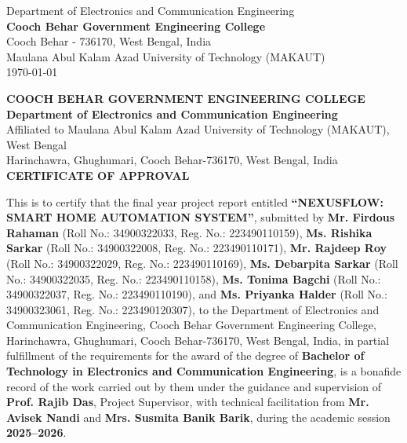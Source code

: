 \documentclass[12pt,a4paper,oneside]{report}
\begin{document}
\begin{titlepage}
\begin{center}
    \vfill
    
    {\fontsize{12}{15}\selectfont Department of Electronics and Communication Engineering} \\
    {\fontsize{14}{18}\selectfont \textbf{Cooch Behar Government Engineering College}} \\
    {\fontsize{11}{14}\selectfont Cooch Behar - 736170, West Bengal, India} \\
    {\fontsize{12}{15}\selectfont Maulana Abul Kalam Azad University of Technology (MAKAUT)} \\[0.4cm]
    {\fontsize{12}{15}\selectfont \today}
\end{center}
\end{titlepage}

\newpage
\begin{center}
    {\fontsize{14}{18}\selectfont \textbf{COOCH BEHAR GOVERNMENT ENGINEERING COLLEGE}} \\
    {\fontsize{11}{14}\selectfont \textbf{Department of Electronics and Communication Engineering}} \\
    {\fontsize{9}{12}\selectfont Affiliated to Maulana Abul Kalam Azad University of Technology (MAKAUT), West Bengal} \\
    {\fontsize{9}{12}\selectfont Harinchawra, Ghughumari, Cooch Behar-736170, West Bengal, India} \\[1cm]
    
    {\fontsize{13}{16}\selectfont \textbf{CERTIFICATE OF APPROVAL}} \\[1cm]
\end{center}

This is to certify that the final year project report entitled \textbf{``NEXUSFLOW: SMART HOME AUTOMATION SYSTEM''}, submitted by \textbf{Mr. Firdous Rahaman} (Roll No.: 34900322033, Reg. No.: 223490110159), \textbf{Ms. Rishika Sarkar} (Roll No.: 34900322008, Reg. No.: 223490110171), \textbf{Mr. Rajdeep Roy} (Roll No.: 34900322029, Reg. No.: 223490110169), \textbf{Ms. Debarpita Sarkar} (Roll No.: 34900322035, Reg. No.: 223490110158), \textbf{Ms. Tonima Bagchi} (Roll No.: 34900322037, Reg. No.: 223490110190), and \textbf{Ms. Priyanka Halder} (Roll No.: 34900323061, Reg. No.: 223490120307), to the Department of Electronics and Communication Engineering, Cooch Behar Government Engineering College, Harinchawra, Ghughumari, Cooch Behar-736170, West Bengal, India, in partial fulfillment of the requirements for the award of the degree of \textbf{Bachelor of Technology in Electronics and Communication Engineering}, is a bonafide record of the work carried out by them under the guidance and supervision of \textbf{Prof. Rajib Das}, Project Supervisor, with technical facilitation from \textbf{Mr. Avisek Nandi} and \textbf{Mrs. Susmita Banik Barik}, during the academic session \textbf{2025–2026}.
\end{document}
